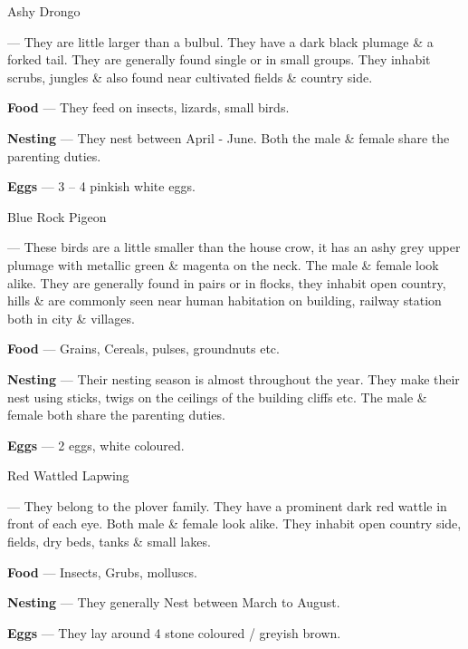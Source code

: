 \begin{bird}{Ashy Drongo}

 --- They are little larger than a bulbul. They have a dark black plumage \& a forked tail. They are generally found single or in small groups. They inhabit scrubs, jungles \& also found near cultivated fields \& country side.

{\large\bf Food} --- They feed on insects, lizards, small birds.

{\large\bf Nesting} --- They nest between April - June. Both the male \& female share the parenting duties.

{\large\bf Eggs} --- 3 -- 4 pinkish white eggs.
\end{bird}

\newpage

\begin{bird}{Blue Rock Pigeon}

 --- These birds are a little smaller than the house crow, it has an ashy grey upper plumage with metallic green \& magenta on the neck. The male \& female look alike. They are generally found in pairs or in flocks, they inhabit open country, hills \& are commonly seen near human habitation on building, railway station both in city \& villages.

{\large\bf Food} --- Grains, Cereals, pulses, groundnuts etc.

{\large\bf Nesting} --- Their nesting season is almost throughout the year. They make their nest using sticks, twigs on the ceilings of the building cliffs etc. The male \& female both share the parenting duties.

{\large\bf Eggs} --- 2 eggs, white coloured.
\end{bird}

\begin{bird}{Red Wattled Lapwing}

 --- They belong to the plover family. They have a prominent dark red wattle in front of each eye. Both male \& female look alike. They inhabit open country side, fields, dry beds, tanks \& small lakes.

{\large\bf Food} --- Insects, Grubs, molluscs.

{\large\bf Nesting} --- They generally Nest between March to August.

{\large\bf Eggs} --- They lay around 4 stone coloured / greyish brown.
\end{bird}

